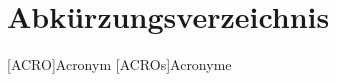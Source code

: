\chapter*{Abkürzungsverzeichnis}

\begin{acronym}
    [ACRO]{Acronym}
    [ACROs]{Acronyme}
\end{acronym}